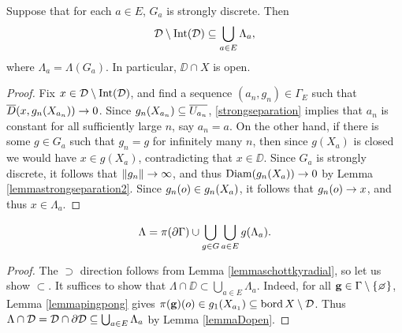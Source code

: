 \begin{lemma}
\label{lemmaDopen}
Suppose that for each $a\in E$, $G_a$ is strongly discrete. Then
\[
\mathcal D\setminus\operatorname{Int}(\mathcal D)\subseteq \bigcup_{a\in E} \Lambda_a,
\]
where $\Lambda_a = \Lambda(G_a)$. In particular, $\DD\cap X$ is open.
\end{lemma}
\begin{proof}
Fix $x\in\mathcal D\setminus\operatorname{Int}(\mathcal D)$, and find a sequence $(a_n,g_n)\in \Gamma_E$ such that $\overline{D}(x,g_n(X_{a_n})) \to 0$. Since $g_n(X_{a_n}) \subseteq \overline{U_{a_n}}$, \eqref{strongseparation} implies that $a_n$ is constant for all sufficiently large $n$, say $a_n = a$. On the other hand, if there is some $g\in G_a$ such that $g_n = g$ for infinitely many $n$, then since $g(X_a)$ is closed we would have $x\in g(X_a)$, contradicting that $x\in\DD$. Since $G_a$ is strongly discrete, it follows that $\|g_n\|\to\infty$, and thus $\operatorname{Diam}(g_n(X_a))\to 0$ by Lemma \ref{lemmastrongseparation2}. Since $g_n(o)\in g_n(X_a)$, it follows that $g_n(o)\to x$, and thus $x\in \Lambda_a$.
\end{proof}




\begin{theorem}
\label{theoremschottkylimitset}
\[
\Lambda = \pi(\partial\Gamma)\cup\bigcup_{g\in G}\bigcup_{a\in E} g(\Lambda_a).
\]
\end{theorem}
\begin{proof}
The $\supset$ direction follows from Lemma \ref{lemmaschottkyradial}, so let us show $\subset$. It suffices to show that $\Lambda\cap \DD\subset \bigcup_{a\in E} \Lambda_a$. Indeed, for all $\gg\in\Gamma\butnot\{\emptyset\}$, Lemma \ref{lemmapingpong} gives $\pi(\mathbf g)(o)\in g_1(X_{a_1}) \subseteq \operatorname{bord} X\setminus\mathcal D$. Thus $\Lambda\cap\mathcal D = \mathcal D\cap\partial\mathcal D \subseteq \bigcup_{a\in E}\Lambda_a$ by Lemma \ref{lemmaDopen}.
\end{proof}

